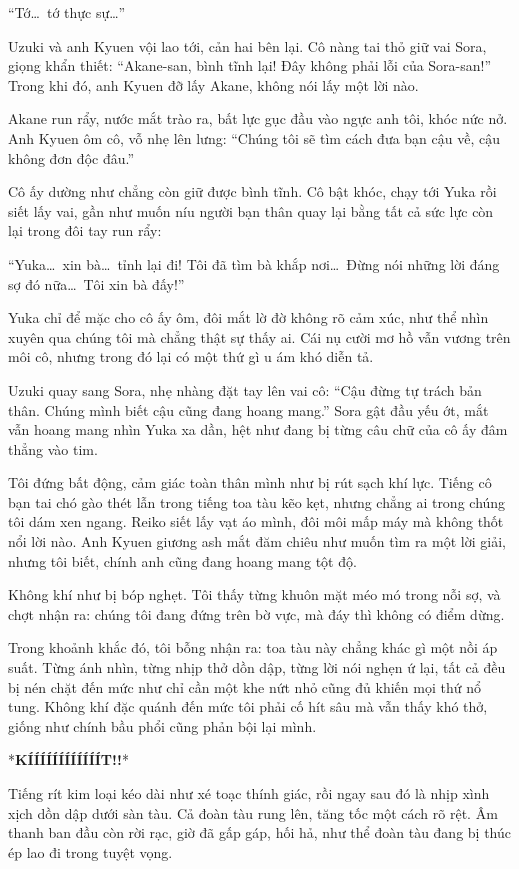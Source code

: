 \documentclass[../main.tex]{subfiles}
\begin{document}
``Tớ\dots\ tớ thực sự\dots''

Uzuki và anh Kyuen vội lao tới, cản hai bên lại. Cô nàng tai thỏ giữ vai Sora, giọng khẩn thiết: ``Akane-san, bình tĩnh lại! Đây không phải lỗi của Sora-san!'' Trong khi đó, anh Kyuen đỡ lấy Akane, không nói lấy một lời nào.

Akane run rẩy, nước mắt trào ra, bất lực gục đầu vào ngực anh tôi, khóc nức nở. Anh Kyuen ôm cô, vỗ nhẹ lên lưng: ``Chúng tôi sẽ tìm cách đưa bạn cậu về, cậu không đơn độc đâu.''

Cô ấy dường như chẳng còn giữ được bình tĩnh. Cô bật khóc, chạy tới Yuka rồi siết lấy vai, gần như muốn níu người bạn thân quay lại bằng tất cả sức lực còn lại trong đôi tay run rẩy:

``Yuka\dots\ xin bà\dots\ tỉnh lại đi! Tôi đã tìm bà khắp nơi\dots\ Đừng nói những lời đáng sợ đó nữa\dots\ Tôi xin bà đấy!''

Yuka chỉ để mặc cho cô ấy ôm, đôi mắt lờ đờ không rõ cảm xúc, như thể nhìn xuyên qua chúng tôi mà chẳng thật sự thấy ai. Cái nụ cười mơ hồ vẫn vương trên môi cô, nhưng trong đó lại có một thứ gì u ám khó diễn tả.

Uzuki quay sang Sora, nhẹ nhàng đặt tay lên vai cô: ``Cậu đừng tự trách bản thân. Chúng mình biết cậu cũng đang hoang mang.'' Sora gật đầu yếu ớt, mắt vẫn hoang mang nhìn Yuka xa dần, hệt như đang bị từng câu chữ của cô ấy đâm thẳng vào tim.

Tôi đứng bất động, cảm giác toàn thân mình như bị rút sạch khí lực. Tiếng cô bạn tai chó gào thét lẫn trong tiếng toa tàu kẽo kẹt, nhưng chẳng ai trong chúng tôi dám xen ngang. Reiko siết lấy vạt áo mình, đôi môi mấp máy mà không thốt nổi lời nào. Anh Kyuen giương ash mắt đăm chiêu như muốn tìm ra một lời giải, nhưng tôi biết, chính anh cũng đang hoang mang tột độ.

Không khí như bị bóp nghẹt. Tôi thấy từng khuôn mặt méo mó trong nỗi sợ, và chợt nhận ra: chúng tôi đang đứng trên bờ vực, mà đáy thì không có điểm dừng.

Trong khoảnh khắc đó, tôi bỗng nhận ra: toa tàu này chẳng khác gì một nồi áp suất. Từng ánh nhìn, từng nhịp thở dồn dập, từng lời nói nghẹn ứ lại, tất cả đều bị nén chặt đến mức như chỉ cần một khe nứt nhỏ cũng đủ khiến mọi thứ nổ tung. Không khí đặc quánh đến mức tôi phải cố hít sâu mà vẫn thấy khó thở, giống như chính bầu phổi cũng phản bội lại mình.

*\textbf{KÍÍÍÍÍÍÍÍÍÍÍÍT!!}*

Tiếng rít kim loại kéo dài như xé toạc thính giác, rồi ngay sau đó là nhịp xình xịch dồn dập dưới sàn tàu. Cả đoàn tàu rung lên, tăng tốc một cách rõ rệt. Âm thanh ban đầu còn rời rạc, giờ đã gấp gáp, hối hả, như thể đoàn tàu đang bị thúc ép lao đi trong tuyệt vọng.
\end{document}
